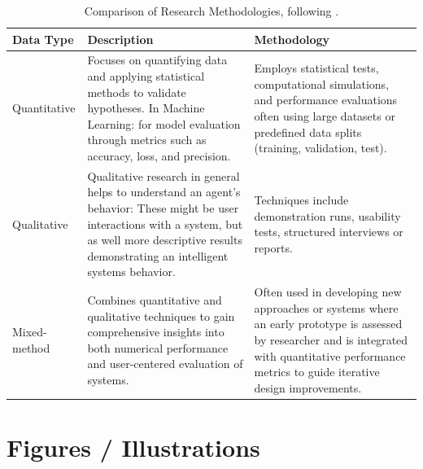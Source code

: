 \begin{table}[ht]
\centering
\caption{Comparison of Research Methodologies, following \citep{paperpile2023methods}.}
\label{tab:research_methods}
\begin{tabular}{
  >{\raggedright\arraybackslash}p{2cm}
  >{\raggedright\arraybackslash}p{4.5cm}
  >{\raggedright\arraybackslash}p{4.5cm}
}
\toprule
\textbf{Data Type} & \textbf{Description} & \textbf{Methodology} \\
\midrule
Quantitative & Focuses on quantifying data and applying statistical methods to validate hypotheses. In Machine Learning: for model evaluation through metrics such as accuracy, loss, and precision. & Employs statistical tests, computational simulations, and performance evaluations often using large datasets or predefined data splits (training, validation, test). \\
\midrule
Qualitative & Qualitative research in general helps to understand an agent's behavior: These might be user interactions with a system, but as well more descriptive results demonstrating an intelligent systems behavior. & Techniques include demonstration runs, usability tests, structured interviews or reports. \\
\midrule
Mixed-method & Combines quantitative and qualitative techniques to gain comprehensive insights into both numerical performance and user-centered evaluation of systems. & Often used in developing new approaches or systems where an early prototype is assessed by researcher and is integrated with quantitative performance metrics to guide iterative design improvements. \\
\bottomrule
\end{tabular}
\end{table}



\section{Figures / Illustrations}
\label{s:image}

